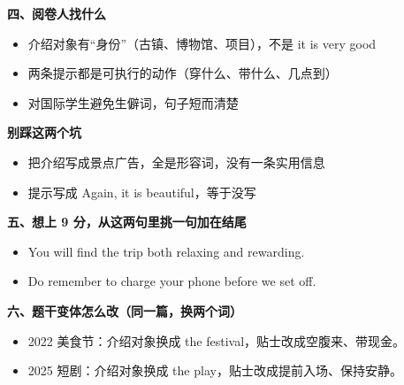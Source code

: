 \documentclass[11pt,a4paper]{ctexart}
\begin{document}
\vspace{5pt}
\noindent\begin{minipage}[t]{0.555\linewidth}
{\color{accent}\bfseries 四、阅卷人找什么}\par
{\footnotesize\begin{itemize}[leftmargin=1.2em,itemsep=1pt,topsep=1pt,parsep=0pt]\setlength{\leftmargin}{1.1em}
\item 介绍对象有“身份”（古镇、博物馆、项目），不是 it is very good
\item 两条提示都是可执行的动作（穿什么、带什么、几点到）
\item 对国际学生避免生僻词，句子短而清楚
\end{itemize}}
\end{minipage}\hfill
\begin{minipage}[t]{0.415\linewidth}
{\color{hot}\bfseries 别踩这两个坑}\par
{\footnotesize\begin{itemize}[leftmargin=1.2em,itemsep=1pt,topsep=1pt,parsep=0pt]\setlength{\leftmargin}{1.1em}
\item 把介绍写成景点广告，全是形容词，没有一条实用信息
\item 提示写成 Again, it is beautiful，等于没写
\end{itemize}}
\end{minipage}\par

\vspace{6pt}
{\color{accent}\bfseries 五、想上 9 分，从这两句里挑一句加在结尾}\par
\vspace{2pt}
{\footnotesize
\begin{itemize}[leftmargin=1.2em,itemsep=1.5pt,topsep=1pt,parsep=0pt]
\item You will find the trip both relaxing and rewarding.
\item Do remember to charge your phone before we set off.
\end{itemize}}\par

\vspace{6pt}
{\color{accent}\bfseries 六、题干变体怎么改（同一篇，换两个词）}\par
\vspace{2pt}
{\footnotesize
\begin{itemize}[leftmargin=1.2em,itemsep=1.5pt,topsep=1pt,parsep=0pt]
\item 2022 美食节：介绍对象换成 the festival，贴士改成空腹来、带现金。
\item 2025 短剧：介绍对象换成 the play，贴士改成提前入场、保持安静。
\end{itemize}}\par
\end{document}
